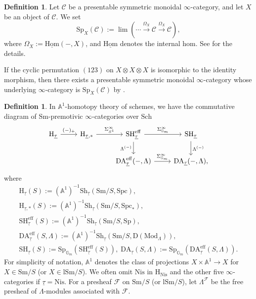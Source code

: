 \documentclass[10pt]{amsart}
\theoremstyle{definition}
\newtheorem{df}[thm]{Definition}
\theoremstyle{remark}
\numberwithin{equation}{subsection}
\newcommand{\A}{\mathbb{A}}
\newcommand{\G}{\mathbb{G}}
\newcommand{\cC}{\mathcal{C}}
\newcommand{\cF}{\mathcal{F}}
\newcommand{\rH}{\mathrm{H}}
\newcommand{\limit}{\mathop{\mathrm{lim}}}
\newcommand{\ul}{\underline}
\newcommand{\eff}{{\mathrm{eff}}}
\newcommand{\Spt}{\mathrm{Sp}}
\newcommand{\Sm}{\mathrm{Sm}}
\newcommand{\SH}{\mathrm{SH}}
\newcommand{\DLambda}{\mathrm{D}(\mathrm{Mod}_{\Lambda})}
\newcommand{\DA}{\mathrm{DA}}
\newcommand{\Sch}{\mathrm{Sch}}
\newcommand{\lSm}{\mathrm{lSm}}
\newcommand{\infShv}{\mathrm{Sh}}
\newcommand{\Spc}{\mathrm{Spc}}
\newcommand{\Map}{\mathrm{Hom}}
\newcommand{\Stab}{\mathrm{Sp}}
\newcommand{\Nis}{\mathrm{Nis}}
\begin{document}
\begin{df}
Let $\cC$ be a presentable symmetric monoidal $\infty$-category, and let $X$ be an object of $\cC$.
We set
\[
\Stab_X(\cC)
:=
\limit(\cdots \xrightarrow{\Omega_{X}} \cC\xrightarrow{\Omega_{X}} \cC),
\]
where $\Omega_{X}:=\ul{\Map}(-,X)$, and $\ul{\Map}$ denotes the internal hom.
See \cite[\S 2.2.1]{zbMATH06374152} for the details.

If the cyclic permutation $(123)$ on $X\otimes X\otimes X$ is isomorphic to the identity morphism, then there exists a presentable symmetric monoidal $\infty$-category whose underlying $\infty$-category is $\Stab_X(\cC)$ by \cite[Corollary 2.22]{zbMATH06374152}.
\end{df}



\begin{df}
\label{logSH.1}
In $\A^1$-homotopy theory of schemes, we have the commutative diagram of $\Sm$-premotivic $\infty$-categories over $\Sch$
\[
\begin{tikzcd}
\rH_{\ul{\tau}} \ar[r,"(-)_+"]&
\rH_{\ul{\tau},*} \ar[r,"\Sigma_{S^1}^\infty"]&
\SH_{\ul{\tau}}^\eff\ar[r,"\Sigma_{\G_m}^\infty"]\ar[d,"{\Lambda^{(-)}}"']&
\SH_{\ul{\tau}}\ar[d,"{\Lambda^{(-)}}"]
\\
&
&
\DA_{\ul{\tau}}^\eff(-,\Lambda)\ar[r,"\Sigma_{\G_m}^\infty"]&
\DA_{\ul{\tau}}(-,\Lambda),
\end{tikzcd}
\]
where
\begin{gather*}
\rH_{\ul{\tau}}(S)
:=
(\A^1)^{-1}\infShv_{\ul{\tau}}(\Sm/S,\Spc),
\\
\rH_{\ul{\tau},*}(S)
:=
(\A^1)^{-1}\infShv_{\ul{\tau}}(\Sm/S,\Spc_*),
\\
\SH_{\ul{\tau}}^\eff(S)
:=
(\A^1)^{-1}\infShv_{\ul{\tau}}(\Sm/S,\Spt),
\\
\DA_{\ul{\tau}}^\eff(S,\Lambda)
:=
(\A^1)^{-1}\infShv_{\ul{\tau}}(\Sm/S,\DLambda),
\\
\SH_{\ul{\tau}}(S)
:=
\Stab_{\G_m}(\SH_{\ul{\tau}}^\eff(S)),
\;
\DA_{\ul{\tau}}(S,\Lambda)
:=
\Stab_{\G_m}(\DA_{\ul{\tau}}^\eff(S,\Lambda)).
\end{gather*}
For simplicity of notation, $\A^1$ denotes the class of projections $X\times \A^1\to X$ for $X\in \Sm/S$ (or $X\in \lSm/S$).
We often omit $\Nis$ in $\rH_{\Nis}$ and the other five $\infty$-categories if $\ul{\tau}=\Nis$.
For a presheaf $\cF$ on $\Sm/S$ (or $\lSm/S$), let $\Lambda^{\cF}$ be the free presheaf of $\Lambda$-modules associated with $\cF$.
\end{df}
\end{document}
